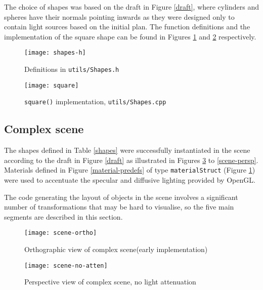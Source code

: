 \documentclass{article}
\begin{document}
		The choice of shapes was based on the draft
		in Figure \ref{draft}, where cylinders and spheres have their normals pointing inwards as they were designed
		only to contain light sources based on the initial plan.
		The function definitions and the implementation of the square shape can be found in Figures \ref{shapes-h} and
		\ref{square-fn} respectively.

		\noindent
		\begin{figure}
			\centering	
			\texttt{[image: shapes-h]}
			\caption{Definitions in \texttt{utils/Shapes.h}}
			\label{shapes-h}
		\end{figure}

		\begin{figure}
			\centering	
			\texttt{[image: square]}
			\caption{\texttt{square()} implementation, \texttt{utils/Shapes.cpp}}
			\label{square-fn}
		\end{figure}

		\subsection{Complex scene}
		The shapes defined in Table \ref{shapes} were successfully instantiated in the scene according
		to the draft in Figure \ref{draft} as illustrated in Figures \ref{scene-ortho} to \ref{scene-persp}.
		Materials defined in Figure \ref{material-predefs} of type \texttt{materialStruct} (Figure \ref{shapes-h})
		were used to accentuate the specular and diffusive lighting provided by OpenGL.

		\bigskip
		
		The code generating the layout of objects in the scene involves a significant number of
		transformations that may be hard to visualise, so the five main segments are described in this section.

		\noindent
		\begin{minipage}{0.5\textwidth}
			\begin{figure}[H]
				\centering	
				\texttt{[image: scene-ortho]}
				\caption{Orthographic view of complex scene\newline(early implementation)}
				\label{scene-ortho}
			\end{figure}		
		\end{minipage}
		\noindent
		\begin{minipage}{0.5\textwidth}
			\begin{figure}[H]
				\centering	
				\texttt{[image: scene-no-atten]}
				\caption{Perspective view of complex scene, no light attenuation}
				\label{scene-persp-no-atten}
			\end{figure}		
		\end{minipage}
\end{document}
